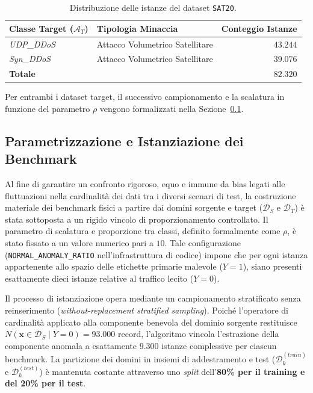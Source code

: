 \begin{table}[H]
    \centering
    \small
    \caption{Distribuzione delle istanze del dataset \texttt{SAT20}.}
    \label{tab:sat20_distribution}
    \begin{tabular}{llr}
        \toprule
        \textbf{Classe Target ($\mathcal{A}_T$)} & \textbf{Tipologia Minaccia} & \textbf{Conteggio Istanze} \\
        \midrule
        \textit{UDP\_DDoS} & Attacco Volumetrico Satellitare & $43.244$ \\
        \textit{Syn\_DDoS} & Attacco Volumetrico Satellitare & $39.076$ \\
        \hline
        \textbf{Totale} & & $\mathbf{82.320}$ \\
        \bottomrule
    \end{tabular}
\end{table}

Per entrambi i dataset target, il successivo campionamento e la scalatura in funzione del parametro $\rho$ vengono formalizzati nella Sezione~\ref{subsec:parametrizzazione_benchmark}.

\subsection{Parametrizzazione e Istanziazione dei Benchmark}
\label{subsec:parametrizzazione_benchmark}

Al fine di garantire un confronto rigoroso, equo e immune da bias legati alle fluttuazioni nella cardinalità dei dati tra i diversi scenari di test, la costruzione materiale dei benchmark fisici a partire dai domini sorgente e target ($\mathcal{D}_S$ e $\mathcal{D}_T$) è stata sottoposta a un rigido vincolo di proporzionamento controllato. 
Il parametro di scalatura e proporzione tra classi, definito formalmente come $\rho$, è stato fissato a un valore numerico pari a $10$. Tale configurazione (\texttt{NORMAL\_ANOMALY\_RATIO} nell'infrastruttura di codice) impone che per ogni istanza appartenente allo spazio delle etichette primarie malevole ($Y=1$), siano presenti esattamente dieci istanze relative al traffico lecito ($Y=0$).

Il processo di istanziazione opera mediante un campionamento stratificato senza reinserimento (\textit{without-replacement stratified sampling}). 
Poiché l'operatore di cardinalità applicato alla componente benevola del dominio sorgente restituisce $N(\mathbf{x} \in \mathcal{D}_S \mid Y=0) = 93.000$ record, l'algoritmo vincola l'estrazione della componente anomala a esattamente $9.300$ istanze complessive per ciascun benchmark. 
La partizione dei domini in insiemi di addestramento e test ($\mathcal{D}_k^{(train)}$ e $\mathcal{D}_k^{(test)}$) è mantenuta costante attraverso uno \textit{split} dell'\textbf{80\% per il training e del 20\% per il test}.

